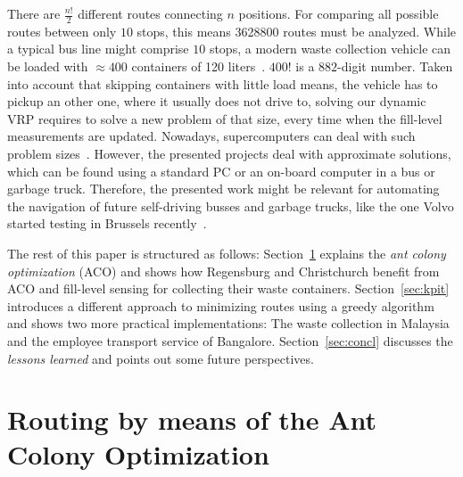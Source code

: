 \documentclass[10pt]{article}
\begin{document}
There are $\frac{n!}{2}$ different routes connecting $n$ positions. 
For comparing all possible routes between only $10$ stops, this means 
3628800 routes must be analyzed. While a typical bus line might 
comprise $10$ stops, a modern waste collection
vehicle can be loaded with $\approx 400$ containers of 120 
liters~\cite{hyundai18}.
$400!$ is a $882$-digit number. 
Taken into account that skipping 
containers with little load means, the vehicle has to pickup an other
one, where it usually does not drive to, solving our dynamic VRP requires
to solve a new problem of that size, every time when the fill-level
measurements are updated. Nowadays, supercomputers can deal with 
such problem sizes~\cite{Burkhovetskiy2017}. However, the
presented projects deal with approximate solutions, which
can be found using a standard PC or an on-board computer in
a bus or garbage truck. Therefore, the presented work might be relevant 
for automating the navigation of future self-driving busses and garbage 
trucks, like the one Volvo started testing in Brussels 
recently~\cite{volvo17}.


The rest of this paper is structured as follows: 
Section~\ref{sec:aco} explains the {\it ant colony optimization} (ACO)
and shows how %
Regensburg 
and Christchurch benefit from ACO and fill-level sensing for collecting 
their waste containers. 
Section~\ref{sec:kpit} introduces a different approach to minimizing routes
using a greedy algorithm and shows two more practical implementations:
The waste collection in Malaysia and the employee transport service of 
Bangalore.
Section~\ref{sec:concl} %
discusses the {\it lessons learned} %
and points out some future perspectives.

\section{Routing by means of the Ant Colony Optimization}
\label{sec:aco}
\end{document}

